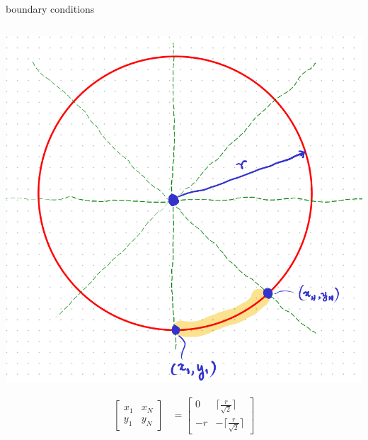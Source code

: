 \documentclass[aspectratio=169,xcolor={dvipsnames,svgnames}]{beamer}
\begin{document}
\begin{frame}[label={sec:orgf1ab005}]{boundary conditions}
\begin{columns}
\begin{column}{.3\columnwidth}
\begin{center}
\includegraphics[width=.9\linewidth]{org-download-images/mid-point_algorithm/2024-09-03_21-50-20_screenshot.png}
\end{center}

\begin{align*}
  \begin{bmatrix} x_1 & x_N \\ y_1 & y_N \end{bmatrix}
  &= \begin{bmatrix}
    0 & \lceil\frac{r}{\sqrt{2}}\rceil \\
    -r & -\lceil\frac{r}{\sqrt{2}}\rceil \end{bmatrix}
\end{align*}
\end{column}


\end{columns}
\end{frame}
\end{document}
